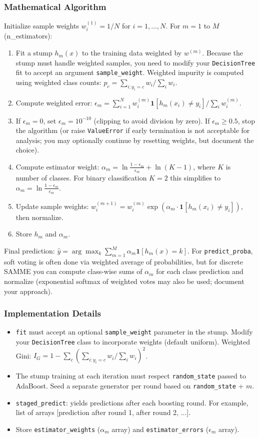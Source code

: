 \documentclass[11pt,a4paper]{article}
\begin{document}
\subsubsection{Mathematical Algorithm}
Initialize sample weights $w_i^{(1)} = 1/N$ for $i=1,\dots,N$.
For $m = 1$ to $M$ (n\_estimators):
\begin{enumerate}[leftmargin=*,label=(\roman*)]
  \item Fit a stump $h_m(x)$ to the training data weighted by $w^{(m)}$. Because the stump must handle weighted samples, you need to modify your \texttt{DecisionTree} fit to accept an argument \texttt{sample\_weight}. Weighted impurity is computed using weighted class counts: $p_c = \sum_{i:y_i=c} w_i / \sum_i w_i$.
  \item Compute weighted error: $\epsilon_m = \sum_{i=1}^N w_i^{(m)} \mathbf{1}[h_m(x_i) \neq y_i] / \sum_i w_i^{(m)}$.
  \item If $\epsilon_m = 0$, set $\epsilon_m = 10^{-10}$ (clipping to avoid division by zero). If $\epsilon_m \ge 0.5$, stop the algorithm (or raise \texttt{ValueError} if early termination is not acceptable for analysis; you may optionally continue by resetting weights, but document the choice).
  \item Compute estimator weight: $\alpha_m = \ln\frac{1-\epsilon_m}{\epsilon_m} + \ln(K-1)$, where $K$ is number of classes. For binary classification $K=2$ this simplifies to $\alpha_m = \ln\frac{1-\epsilon_m}{\epsilon_m}$.
  \item Update sample weights: $w_i^{(m+1)} = w_i^{(m)} \exp(\alpha_m \cdot \mathbf{1}[h_m(x_i) \neq y_i])$, then normalize.
  \item Store $h_m$ and $\alpha_m$.
\end{enumerate}
Final prediction: $\hat{y} = \arg\max_k \sum_{m=1}^M \alpha_m \mathbf{1}[h_m(x)=k]$.
For \texttt{predict\_proba}, soft voting is often done via weighted average of probabilities, but for discrete SAMME you can compute class-wise sums of $\alpha_m$ for each class prediction and normalize (exponential softmax of weighted votes may also be used; document your approach).
\subsubsection{Implementation Details}
\begin{itemize}
  \item \texttt{fit} must accept an optional \texttt{sample\_weight} parameter in the stump. Modify your \texttt{DecisionTree} class to incorporate weights (default uniform). Weighted Gini: $I_G = 1 - \sum_c (\sum_{i:y_i=c} w_i / \sum_i w_i)^2$.
  \item The stump training at each iteration must respect \texttt{random\_state} passed to AdaBoost. Seed a separate generator per round based on \texttt{random\_state} + $m$.
  \item \texttt{staged\_predict}: yields predictions after each boosting round. For example, list of arrays [prediction after round 1, after round 2, ...].
  \item Store \texttt{estimator\_weights} ($\alpha_m$ array) and \texttt{estimator\_errors} ($\epsilon_m$ array).
\end{itemize}
\end{document}
